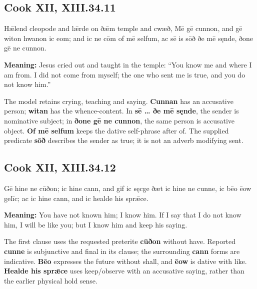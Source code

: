 \par\begin{minipage}{\linewidth}\raggedright
\subsection*{Cook XII, XIII.34.11}

Hǣlend cleopode and lǣrde on ðǣm temple and cwæð, Mē gē cunnon, and gē witon hwanon ic eom; and ic ne cōm of mē selfum, ac sē is sōð ðe mē sęnde, ðone gē ne cunnon.

\textbf{Meaning:} Jesus cried out and taught in the temple: “You know me and where I am from. I did not come from myself; the one who sent me is true, and you do not know him.”

The model retains crying, teaching and saying. \textbf{Cunnan} has an accusative person; \textbf{witan} has the whence-content. In \textbf{sē … ðe mē sęnde}, the sender is nominative subject; in \textbf{ðone gē ne cunnon}, the same person is accusative object. \textbf{Of mē selfum} keeps the dative self-phrase after of. The supplied predicate \textbf{sōð} describes the sender as true; it is not an adverb modifying sent.

\end{minipage}\par\addvspace{4pt}

\par\begin{minipage}{\linewidth}\raggedright
\subsection*{Cook XII, XIII.34.12}

Gē hine ne cūðon; ic hine cann, and gif ic sęcge ðæt ic hine ne cunne, ic bēo ēow gelīc; ac ic hine cann, and ic healde his sprǣce.

\textbf{Meaning:} You have not known him; I know him. If I say that I do not know him, I will be like you; but I know him and keep his saying.

The first clause uses the requested preterite \textbf{cūðon} without have. Reported \textbf{cunne} is subjunctive and final in its clause; the surrounding \textbf{cann} forms are indicative. \textbf{Bēo} expresses the future without shall, and \textbf{ēow} is dative with like. \textbf{Healde his sprǣce} uses keep/\allowbreak{}observe with an accusative saying, rather than the earlier physical hold sense.

\end{minipage}\par\addvspace{4pt}

